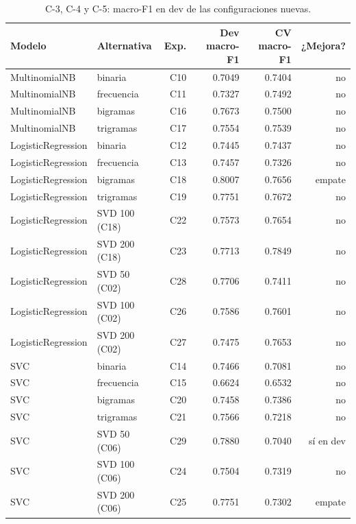 \documentclass[11pt,a4paper]{article}
\begin{document}
\begin{table}[htbp]
\centering
\small
\caption{C-3, C-4 y C-5: macro-F1 en dev de las configuraciones nuevas.}
\label{tab:c3c5}
\footnotesize
\begin{tabular}{@{}llrrrr@{}}
\toprule
Modelo & Alternativa & Exp. & Dev macro-F1 & CV macro-F1 & ¿Mejora?\\
\midrule
MultinomialNB & binaria & C10 & 0.7049 & 0.7404 & no\\
MultinomialNB & frecuencia & C11 & 0.7327 & 0.7492 & no\\
MultinomialNB & bigramas & C16 & 0.7673 & 0.7500 & no\\
MultinomialNB & trigramas & C17 & 0.7554 & 0.7539 & no\\
\midrule
LogisticRegression & binaria & C12 & 0.7445 & 0.7437 & no\\
LogisticRegression & frecuencia & C13 & 0.7457 & 0.7326 & no\\
LogisticRegression & bigramas & C18 & 0.8007 & 0.7656 & empate\\
LogisticRegression & trigramas & C19 & 0.7751 & 0.7672 & no\\
LogisticRegression & SVD 100 (C18) & C22 & 0.7573 & 0.7654 & no\\
LogisticRegression & SVD 200 (C18) & C23 & 0.7713 & 0.7849 & no\\
LogisticRegression & SVD 50 (C02) & C28 & 0.7706 & 0.7411 & no\\
LogisticRegression & SVD 100 (C02) & C26 & 0.7586 & 0.7601 & no\\
LogisticRegression & SVD 200 (C02) & C27 & 0.7475 & 0.7653 & no\\
\midrule
SVC & binaria & C14 & 0.7466 & 0.7081 & no\\
SVC & frecuencia & C15 & 0.6624 & 0.6532 & no\\
SVC & bigramas & C20 & 0.7458 & 0.7386 & no\\
SVC & trigramas & C21 & 0.7566 & 0.7218 & no\\
SVC & SVD 50 (C06) & C29 & 0.7880 & 0.7040 & sí en dev\\
SVC & SVD 100 (C06) & C24 & 0.7504 & 0.7319 & no\\
SVC & SVD 200 (C06) & C25 & 0.7751 & 0.7302 & empate\\
\bottomrule
\end{tabular}
\end{table}
\end{document}
